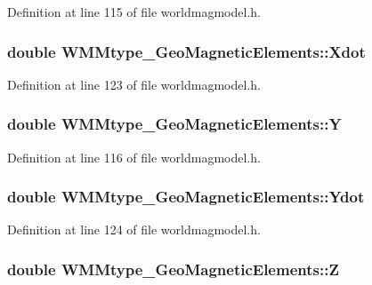\-Definition at line 115 of file worldmagmodel.\-h.

\hypertarget{struct_w_m_mtype___geo_magnetic_elements_a98363bfa933b65aae742479e14dc209a}{
\subsubsection[{\-Xdot}]{\setlength{\rightskip}{0pt plus 5cm}double {\bf \-W\-M\-Mtype\-\_\-\-Geo\-Magnetic\-Elements\-::\-Xdot}}}\label{struct_w_m_mtype___geo_magnetic_elements_a98363bfa933b65aae742479e14dc209a}


\-Definition at line 123 of file worldmagmodel.\-h.

\hypertarget{struct_w_m_mtype___geo_magnetic_elements_a0b311ece921afc948e5e8dda01f7584a}{
\subsubsection[{\-Y}]{\setlength{\rightskip}{0pt plus 5cm}double {\bf \-W\-M\-Mtype\-\_\-\-Geo\-Magnetic\-Elements\-::\-Y}}}\label{struct_w_m_mtype___geo_magnetic_elements_a0b311ece921afc948e5e8dda01f7584a}


\-Definition at line 116 of file worldmagmodel.\-h.

\hypertarget{struct_w_m_mtype___geo_magnetic_elements_aaecfb6ce93c718489c1d0982d43d56b6}{
\subsubsection[{\-Ydot}]{\setlength{\rightskip}{0pt plus 5cm}double {\bf \-W\-M\-Mtype\-\_\-\-Geo\-Magnetic\-Elements\-::\-Ydot}}}\label{struct_w_m_mtype___geo_magnetic_elements_aaecfb6ce93c718489c1d0982d43d56b6}


\-Definition at line 124 of file worldmagmodel.\-h.

\hypertarget{struct_w_m_mtype___geo_magnetic_elements_a989cffa7f071bb16f17a2be007dd5419}{
\subsubsection[{\-Z}]{\setlength{\rightskip}{0pt plus 5cm}double {\bf \-W\-M\-Mtype\-\_\-\-Geo\-Magnetic\-Elements\-::\-Z}}}\label{struct_w_m_mtype___geo_magnetic_elements_a989cffa7f071bb16f17a2be007dd5419}


